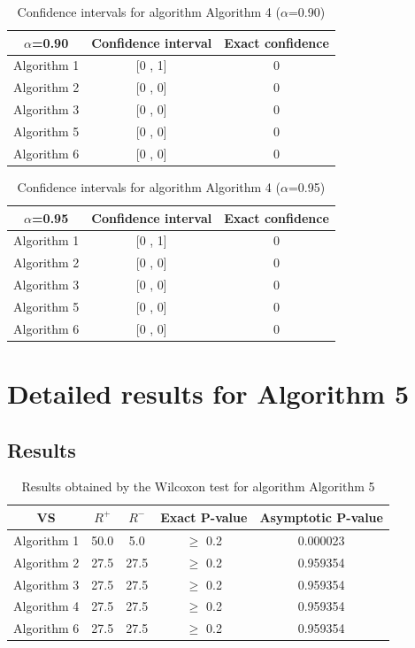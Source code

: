 \documentclass[a4paper,10pt]{article}
\begin{document}
\begin{table}[!htp]
\centering\small
\begin{tabular}{
|c|c|c|}
\hline
 $\alpha$=0.90 & Confidence interval & Exact confidence \\ \hline 
Algorithm 1 & [0 , 1] & 0\\ \hline 
Algorithm 2 & [0 , 0] & 0\\ \hline 
Algorithm 3 & [0 , 0] & 0\\ \hline 
Algorithm 5 & [0 , 0] & 0\\ \hline 
Algorithm 6 & [0 , 0] & 0\\ \hline 

\end{tabular}
\caption{Confidence intervals for algorithm Algorithm 4 ($\alpha$=0.90)}
\end{table}
\begin{table}[!htp]
\centering\small
\begin{tabular}{
|c|c|c|}
\hline
 $\alpha$=0.95 & Confidence interval & Exact confidence \\ \hline 
Algorithm 1 & [0 , 1] & 0\\ \hline 
Algorithm 2 & [0 , 0] & 0\\ \hline 
Algorithm 3 & [0 , 0] & 0\\ \hline 
Algorithm 5 & [0 , 0] & 0\\ \hline 
Algorithm 6 & [0 , 0] & 0\\ \hline 

\end{tabular}
\caption{Confidence intervals for algorithm Algorithm 4 ($\alpha$=0.95)}
\end{table}

 \clearpage 


\section{Detailed results for Algorithm 5}


\subsection{Results}

\begin{table}[!htp]
\centering\small
\begin{tabular}{
|c|c|c|c|c|}
\hline
 VS & $R^{+}$ & $R^{-}$ & Exact P-value & Asymptotic P-value \\ \hline 
Algorithm 1 & 50.0 & 5.0 & $\geq$ 0.2 & 0.000023\\ \hline 
Algorithm 2 & 27.5 & 27.5 & $\geq$ 0.2 & 0.959354\\ \hline 
Algorithm 3 & 27.5 & 27.5 & $\geq$ 0.2 & 0.959354\\ \hline 
Algorithm 4 & 27.5 & 27.5 & $\geq$ 0.2 & 0.959354\\ \hline 
Algorithm 6 & 27.5 & 27.5 & $\geq$ 0.2 & 0.959354\\ \hline 

\end{tabular}
\caption{Results obtained by the Wilcoxon test for algorithm Algorithm 5}
\end{table}
\end{document}
